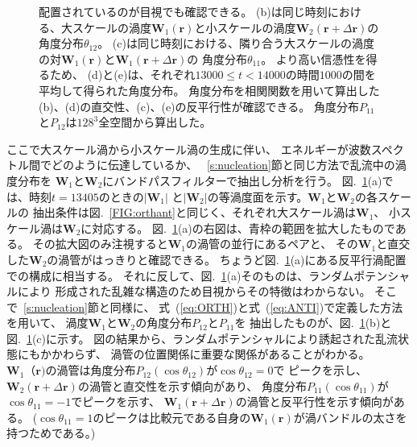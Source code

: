 \documentclass[12pt,a4paper]{jbook}
\begin{document}
\begin{figure}[H]
{                    配置されているのが目視でも確認できる。
                    (b)は同じ時刻における、大スケールの渦度$\bm{W}_1(\bm{r})$と小スケールの渦度$\bm{W}_2(\bm{r}+\Delta\bm{r})$の
                    角度分布$\theta_{12}$。
                    (c)は同じ時刻における、隣り合う大スケールの渦度の対$\bm{W}_1(\bm{r})$と$\bm{W}_1(\bm{r}+\Delta\bm{r})$の
                    角度分布$\theta_{11}$。
                    より高い信憑性を得るため、
                    (d)と(e)は、それぞれ$13000 \leq t < 14000$の時間$1000$の間を平均して得られた角度分布。
                    角度分布を相関関数を用いて算出した(b)、(d)の直交性、(c)、(e)の反平行性が確認できる。
                    角度分布$P_{11}$と$P_{12}$は$128^3$全空間から算出した。
				}
				\label{FIG:antipara}
			\end{figure}
			ここで大スケール渦から小スケール渦の生成に伴い、
			エネルギーが波数スペクトル間でどのように伝達しているか、
            ~\ref{s:nucleation}節と同じ方法で乱流中の渦度分布を
			$\bm{W}_1$と$\bm{W}_2$にバンドパスフィルターで抽出し分析を行う。
			図.~\ref{FIG:antipara}(a)では、時刻$t=13405$のときの$|\bm{W}_1|$
			と$|\bm{W}_2|$の等渦度面を示す。$\bm{W}_1$と$\bm{W}_2$の各スケールの
			抽出条件は図.~\ref{FIG:orthant}と同じく、それぞれ大スケール渦は$\bm{W}_1$、
			小スケール渦は$\bm{W}_2$に対応する。
			図.~\ref{FIG:antipara}(a)の右図は、青枠の範囲を拡大したものである。
			その拡大図のみ注視すると$\bm{W}_1$の渦管の並行にあるペアと、
			その$\bm{W}_1$と直交した$\bm{W}_2$の渦管がはっきりと確認できる。
			ちょうど図.~\ref{FIG:antipara}(a)にある反平行渦配置での構成に相当する。
			それに反して、図.~\ref{FIG:antipara}(a)そのものは、ランダムポテンシャルにより
			形成された乱雑な構造のため目視からその特徴はわからない。
			そこで~\ref{s:nucleation}節と同様に、
            式~(\ref{eq:ORTH})と式~(\ref{eq:ANTI})で定義した方法を用いて、
			渦度$\bm{W}_1$と$\bm{W}_2$の角度分布$P_{12}$と$P_{11}$を
			抽出したものが、図.~\ref{FIG:antipara}(b)と図.~\ref{FIG:antipara}(c)に示す。
            図の結果から、ランダムポテンシャルにより誘起された乱流状態にもかかわらず、
            渦管の位置関係に重要な関係があることがわかる。
			$\bm{W}_1（\bm{r})$の渦管は角度分布$P_{12}(\cos \theta_{12})$が$\cos \theta_{12}=0$で
			ピークを示し、$\bm{W}_2(\bm{r} + \Delta \bm{r})$の渦管と直交性を示す傾向があり、
			角度分布$P_{11}(\cos \theta_{11})$が$\cos \theta_{11}=-1$でピークを示す、
			$\bm{W}_1(\bm{r} + \Delta \bm{r})$の渦管と反平行性を示す傾向がある。
			($\cos \theta_{11}=1$のピークは比較元である自身の$\bm{W}_1(\bm{r})$が渦バンドルの太さを持つためである。)
\end{document}
